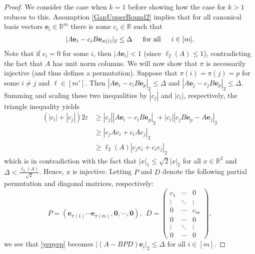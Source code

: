\documentclass[journal, onecolumn]{IEEEtran}
\begin{document}
\begin{proof}
We consider the case when $k=1$ before showing how the case for $k>1$ reduces to this. Assumption \eqref{GapUpperBound2} implies that for all canonical basis vectors $\mathbf{e}_i \in \mathbb{R}^m$ there is some $c_i \in \mathbb{R}$ such that 
\begin{align}\label{yepyep}
|A\mathbf{e}_i - c_iB\mathbf{e}_{\pi(i)}|_2 \leq \Delta \indent \text{for all} \indent i \in [m].
\end{align}
Note that if $c_i = 0$ for some $i$, then $|A\mathbf{e}_i| < 1$ (since $\ell_2(A) \leq 1$), contradicting the fact that $A$ has unit norm columns. We will now show that $\pi$ is necessarily injective (and thus defines a permutation). Suppose that $\pi(i) = \pi(j) = p$ for some $i \neq j$ and $\ell \in [m']$. Then $|A\mathbf{e}_i - c_iB\mathbf{e}_{p}|_2  \leq \Delta$ and $|A\mathbf{e}_j - c_jB\mathbf{e}_{p}|_2 \leq \Delta$. Summing and scaling these two inequalities by $|c_j|$ and $|c_i|$, respectively, the triangle inequality yields
\begin{align*}
(|c_i| + |c_j|) 2\varepsilon
&\geq |c_j||A\mathbf{e}_i - c_iB\mathbf{e}_{p}|_2 + |c_i||c_jB\mathbf{e}_{p} - A\mathbf{e}_j|_2 \\
&\geq |c_jAe_i + c_iAe_j|_2 \\
&\geq \ell_2(A)|c_je_i + c_ie_j|_2
\end{align*}
%
which is in contradiction with the fact that $|x|_1 \leq \sqrt{2}|x|_2$ for all $x \in \mathbb{R}^2$ and $\Delta < \frac{\ell_2(A)}{\sqrt{2}}$. Hence, $\pi$ is injective. Letting $P$ and $D$ denote the following partial permutation and diagonal matrices, respectively:
\begin{equation}\label{PandD}
P = \left( \mathbf{e}_{\pi(1)} \cdots \mathbf{e}_{\pi(m)}, \mathbf{0}, \cdots, \mathbf{0} \right), \ \ D = \left(\begin{array}{ccc}c_1 & \cdots & 0 \\\vdots & \ddots & \vdots \\0 & \cdots & c_m \\ 0 & \cdots & 0 \\ \vdots & \ddots & \vdots \\ 0 & \cdots & 0
\end{array}\right),
\end{equation}
%
we see that \eqref{yepyep} becomes $|(A - BPD)\mathbf{e}_i|_2 \leq \Delta$ for all $i \in [m]$.


\end{proof}
\end{document}
